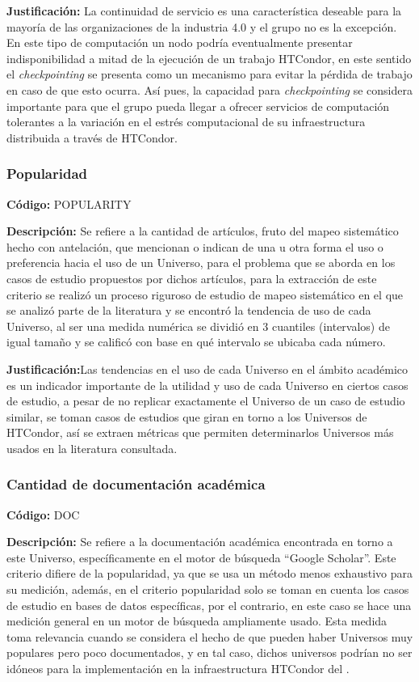 \textbf{Justificación:} La continuidad de servicio es una característica deseable para la
mayoría de las organizaciones de la industria 4.0 y el grupo \GRID no es la
excepción. En este tipo de computación un nodo podría eventualmente presentar
indisponibilidad a mitad de la ejecución de un trabajo HTCondor, en este sentido el
\textit{checkpointing} se presenta como un mecanismo para evitar la pérdida de trabajo en
caso de que esto ocurra. Así pues, la capacidad para \textit{checkpointing} se considera
importante para que el grupo \GRID pueda llegar a ofrecer servicios de computación
tolerantes a la variación en el estrés computacional de su infraestructura distribuida
a través de HTCondor.



\subsubsection{Popularidad}
\textbf{Código:} POPULARITY

\textbf{Descripción:} Se refiere a la cantidad de artículos, fruto del mapeo sistemático
hecho con antelación, que mencionan o indican de una u otra forma el uso o
preferencia hacia el uso de un Universo, para el problema que se aborda en los
casos de estudio propuestos por dichos artículos, para la extracción de este
criterio se realizó un proceso riguroso de estudio de mapeo sistemático en el que
se analizó parte de la literatura y se encontró la tendencia de uso de cada
Universo, al ser una medida numérica se dividió en 3 cuantiles (intervalos) de igual
tamaño y se calificó con base en qué intervalo se ubicaba cada número.


\textbf{Justificación:}Las tendencias en el uso de cada Universo en el ámbito académico
es un indicador importante de la utilidad y uso de cada Universo en ciertos casos
de estudio, a pesar de no replicar exactamente el Universo de un caso de estudio
similar, se toman casos de estudios que giran en torno a los Universos de
HTCondor, así se extraen métricas que permiten determinarlos Universos más
usados en la literatura consultada.


\subsubsection{Cantidad de documentación académica}
\textbf{Código:} DOC

\textbf{Descripción:} Se refiere a la documentación académica encontrada en torno a
este Universo, específicamente en el motor de búsqueda “Google Scholar”. Este
criterio difiere de la popularidad, ya que se usa un método menos exhaustivo para
su medición, además, en el criterio popularidad solo se toman en cuenta los casos
de estudio en bases de datos específicas, por el contrario, en este caso se hace
una medición general en un motor de búsqueda ampliamente usado. Esta medida
toma relevancia cuando se considera el hecho de que pueden haber Universos
muy populares pero poco documentados, y en tal caso, dichos universos podrían
no ser idóneos para la implementación en la infraestructura HTCondor del \GRID.


